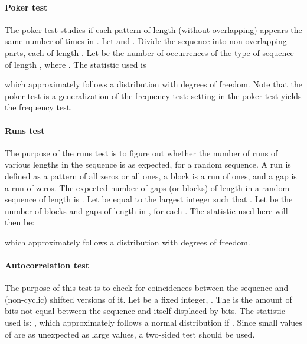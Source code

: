 \documentclass[10pt, a4paper, conference, compsocconf]{IEEEtran}
\begin{document}
\paragraph{Poker test}
The poker test studies if each pattern of length  (without overlapping) appears the same number of times in . Let  and . Divide the sequence  into  non-overlapping parts, each of length . Let  be the number of occurrences of the  type of sequence of length , where . The statistic used is 

which approximately follows a  distribution with  degrees of freedom. Note that the poker test is a generalization of the frequency test: setting  in the poker test yields the frequency test.

\paragraph{Runs test}
The purpose of the runs test is to figure out whether the number of runs of various lengths in the sequence  is as expected, for a random sequence. A run is defined as a pattern of all zeros or all ones, a block is a run of ones, and a gap is a run of zeros. The expected number of gaps (or blocks) of length  in a random sequence of length  is . Let  be equal to the largest integer  such that . Let
 be the number of blocks and gaps of length  in , for each . The statistic used here will then be:

\noindent which approximately follows a  distribution with  degrees of freedom.

\paragraph{Autocorrelation test}
The purpose of this test is to check for coincidences between the sequence  and (non-cyclic) shifted versions of it. Let  be a fixed integer, . The   is the amount of bits not equal between the sequence and itself displaced by  bits. The statistic used is:
,
which approximately follows a normal distribution  if . Since small values of  are as unexpected as large values, a two-sided test should be used.
\end{document}
